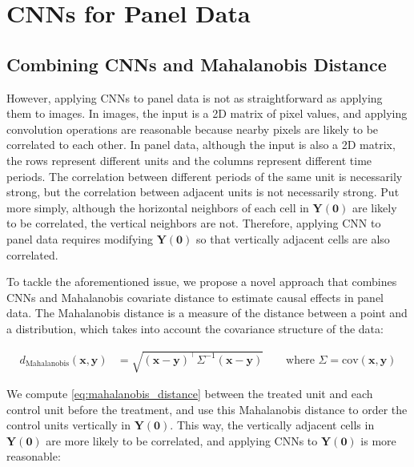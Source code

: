 \section{CNNs for Panel Data}


\subsection{Combining CNNs and Mahalanobis Distance}

However, applying CNNs to panel data is not as straightforward as applying them to images.
In images, the input is a 2D matrix of pixel values, and applying convolution operations are reasonable
because nearby pixels are likely to be correlated to each other.
In panel data, although the input is also a 2D matrix, the rows represent different units and the columns represent different time periods.
The correlation between different periods of the same unit is necessarily strong, but the correlation between adjacent units is not necessarily strong.
Put more simply, although the horizontal neighbors of each cell in $\mathbf{Y(0)}$ are likely to be correlated, the vertical neighbors are not.
Therefore, applying CNN to panel data requires modifying $\mathbf{Y(0)}$ so that vertically adjacent cells are also correlated.

To tackle the aforementioned issue, we propose a novel approach that combines CNNs and Mahalanobis covariate distance to estimate causal effects in panel data.
The Mahalanobis distance is a measure of the distance between a point and a distribution, which takes into account the covariance structure of the data:

\begin{align}
    d_{\text{Mahalanobis}}(\mathbf{x}, \mathbf{y}) &= \sqrt{(\mathbf{x} - \mathbf{y})^\top \Sigma^{-1} (\mathbf{x} - \mathbf{y})}  \qquad \text{where } \Sigma = \text{cov}(\mathbf{x}, \mathbf{y})\label{eq:mahalanobis_distance}
\end{align}

We compute \eqref{eq:mahalanobis_distance} between the treated unit and each control unit before the treatment, 
and use this Mahalanobis distance to order the control units vertically in $\mathbf{Y(0)}$.
This way, the vertically adjacent cells in $\mathbf{Y(0)}$ are more likely to be correlated, and applying CNNs to $\mathbf{Y(0)}$ is more reasonable:

